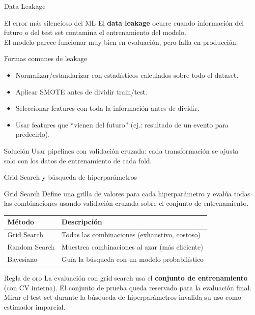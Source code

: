 \documentclass[aspectratio=169]{beamer}
\begin{document}
\begin{frame}{Data Leakage}
  \begin{alertblock}{El error más silencioso del ML}
    El \textbf{data leakage} ocurre cuando información del futuro o del test set
    contamina el entrenamiento del modelo.\\
    El modelo parece funcionar muy bien en evaluación, pero falla en producción.
  \end{alertblock}

  \medskip
  \begin{block}{Formas comunes de leakage}
    \begin{itemize}
      \item Normalizar/estandarizar con estadísticos calculados sobre todo el dataset.
      \item Aplicar SMOTE antes de dividir train/test.
      \item Seleccionar features con toda la información antes de dividir.
      \item Usar features que ``vienen del futuro'' (ej.: resultado de un evento para predecirlo).
    \end{itemize}
  \end{block}

  \medskip
  \begin{exampleblock}{Solución}
    Usar pipelines con validación cruzada: cada transformación se ajusta solo con los datos de entrenamiento de cada fold.
  \end{exampleblock}
\end{frame}

\begin{frame}{Grid Search y búsqueda de hiperparámetros}
  \begin{block}{Grid Search}
    Define una grilla de valores para cada hiperparámetro y evalúa todas las combinaciones
    usando validación cruzada sobre el conjunto de entrenamiento.
  \end{block}

  \medskip
  \begin{center}
  \begin{tabular}{ll}
    \toprule
    \textbf{Método} & \textbf{Descripción} \\
    \midrule
    Grid Search   & Todas las combinaciones (exhaustivo, costoso) \\
    Random Search & Muestrea combinaciones al azar (más eficiente) \\
    Bayesiano     & Guía la búsqueda con un modelo probabilístico \\
    \bottomrule
  \end{tabular}
  \end{center}

  \medskip
  \begin{alertblock}{Regla de oro}
    La evaluación con grid search usa el \textbf{conjunto de entrenamiento} (con CV interna).
    El conjunto de prueba queda reservado para la evaluación final.
    Mirar el test set durante la búsqueda de hiperparámetros invalida su uso como estimador imparcial.
  \end{alertblock}
\end{frame}
\end{document}
